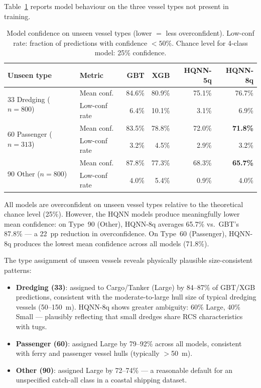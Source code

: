 \documentclass[journal]{IEEEtran}
\begin{document}
Table~\ref{tab:ood_results} reports model behaviour on the three vessel
types not present in training.

\begin{table}[H]
\centering
\caption{Model confidence on unseen vessel types (lower $=$ less overconfident).
         Low-conf rate: fraction of predictions with confidence $< 50\%$.
         Chance level for 4-class model: 25\% confidence.}
\label{tab:ood_results}
\begin{tabular}{llrrrr}
\toprule
\textbf{Unseen type} & \textbf{Metric} & \textbf{GBT} & \textbf{XGB} & \textbf{HQNN-5q} & \textbf{HQNN-8q} \\
\midrule
\multirow{2}{*}{33 Dredging ($n=800$)} &
  Mean conf.   & 84.6\% & 80.9\% & 75.1\% & 76.7\% \\
& Low-conf rate & 6.4\%  & 10.1\% & 3.1\%  & 6.9\% \\
\midrule
\multirow{2}{*}{60 Passenger ($n=313$)} &
  Mean conf.   & 83.5\% & 78.8\% & 72.0\% & \textbf{71.8\%} \\
& Low-conf rate & 3.2\%  & 4.5\%  & 2.9\%  & 3.2\% \\
\midrule
\multirow{2}{*}{90 Other ($n=800$)} &
  Mean conf.   & 87.8\% & 77.3\% & 68.3\% & \textbf{65.7\%} \\
& Low-conf rate & 4.0\%  & 5.4\%  & 0.9\%  & 4.0\% \\
\bottomrule
\end{tabular}
\end{table}

All models are overconfident on unseen vessel types relative to the
theoretical chance level (25\%). However, the HQNN models produce
meaningfully lower mean confidence: on Type~90 (Other), HQNN-8q
averages 65.7\% vs.\ GBT's 87.8\% — a 22~pp reduction in overconfidence.
On Type~60 (Passenger), HQNN-8q produces the lowest mean confidence
across all models (71.8\%).

The type assignment of unseen vessels reveals physically plausible
size-consistent patterns:
\begin{itemize}
  \item \textbf{Dredging (33)}: assigned to Cargo/Tanker (Large) by
        84--87\% of GBT/XGB predictions, consistent with the moderate-to-large
        hull size of typical dredging vessels (50--150~m). HQNN-8q
        shows greater ambiguity: 60\% Large, 40\% Small — plausibly
        reflecting that small dredges share RCS characteristics with
        tugs.
  \item \textbf{Passenger (60)}: assigned Large by 79--92\% across all
        models, consistent with ferry and passenger vessel hulls
        (typically $>$50~m).
  \item \textbf{Other (90)}: assigned Large by 72--74\% — a reasonable
        default for an unspecified catch-all class in a coastal shipping
        dataset.
\end{itemize}
\end{document}
